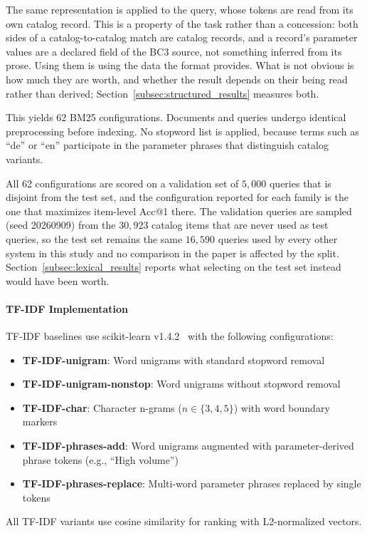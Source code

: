 \documentclass[preprint,review,12pt]{elsarticle}
\begin{document}
The same representation is applied to the query, whose tokens are read from its own catalog record. This is a property of the task rather than a concession: both sides of a catalog-to-catalog match are catalog records, and a record's parameter values are a declared field of the BC3 source, not something inferred from its prose. Using them is using the data the format provides. What is not obvious is how much they are worth, and whether the result depends on their being read rather than derived; Section~\ref{subsec:structured_results} measures both.

This yields 62 BM25 configurations. Documents and queries undergo identical preprocessing before indexing. No stopword list is applied, because terms such as ``de'' or ``en'' participate in the parameter phrases that distinguish catalog variants.

All 62 configurations are scored on a validation set of $5{,}000$ queries that is disjoint from the test set, and the configuration reported for each family is the one that maximizes item-level Acc@1 there. The validation queries are sampled (seed 20260909) from the $30{,}923$ catalog items that are never used as test queries, so the test set remains the same $16{,}590$ queries used by every other system in this study and no comparison in the paper is affected by the split. Section~\ref{subsec:lexical_results} reports what selecting on the test set instead would have been worth.

\paragraph{TF-IDF Implementation}
TF-IDF baselines use scikit-learn v1.4.2~\citep{pedregosa2011scikit} with the following configurations:
\begin{itemize}
    \item \textbf{TF-IDF-unigram}: Word unigrams with standard stopword removal
    \item \textbf{TF-IDF-unigram-nonstop}: Word unigrams without stopword removal
    \item \textbf{TF-IDF-char}: Character n-grams ($n \in \{3,4,5\}$) with word boundary markers
    \item \textbf{TF-IDF-phrases-add}: Word unigrams augmented with parameter-derived phrase tokens (e.g., ``High volume'')
    \item \textbf{TF-IDF-phrases-replace}: Multi-word parameter phrases replaced by single tokens
\end{itemize}
All TF-IDF variants use cosine similarity for ranking with L2-normalized vectors.
\end{document}
